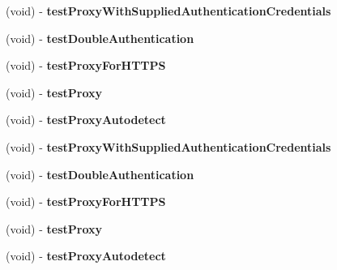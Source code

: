 \begin{DoxyCompactItemize}
\item 
\hypertarget{interface_proxy_tests_a51146a296d58652cdf040a0e36c39d96}{
(void) -\/ {\bfseries test\-Proxy\-With\-Supplied\-Authentication\-Credentials}}
\label{interface_proxy_tests_a51146a296d58652cdf040a0e36c39d96}

\item 
\hypertarget{interface_proxy_tests_a37018a3f1cce212ab02d59150bf021fc}{
(void) -\/ {\bfseries test\-Double\-Authentication}}
\label{interface_proxy_tests_a37018a3f1cce212ab02d59150bf021fc}

\item 
\hypertarget{interface_proxy_tests_aa344ec9954815b1d25a1d9d60ce5136c}{
(void) -\/ {\bfseries test\-Proxy\-For\-H\-T\-T\-P\-S}}
\label{interface_proxy_tests_aa344ec9954815b1d25a1d9d60ce5136c}

\item 
\hypertarget{interface_proxy_tests_a40fc96bd3915e51e2e1d9121df01b37e}{
(void) -\/ {\bfseries test\-Proxy}}
\label{interface_proxy_tests_a40fc96bd3915e51e2e1d9121df01b37e}

\item 
\hypertarget{interface_proxy_tests_a52703f731ab16ea703ab0b9983b559d2}{
(void) -\/ {\bfseries test\-Proxy\-Autodetect}}
\label{interface_proxy_tests_a52703f731ab16ea703ab0b9983b559d2}

\item 
\hypertarget{interface_proxy_tests_a51146a296d58652cdf040a0e36c39d96}{
(void) -\/ {\bfseries test\-Proxy\-With\-Supplied\-Authentication\-Credentials}}
\label{interface_proxy_tests_a51146a296d58652cdf040a0e36c39d96}

\item 
\hypertarget{interface_proxy_tests_a37018a3f1cce212ab02d59150bf021fc}{
(void) -\/ {\bfseries test\-Double\-Authentication}}
\label{interface_proxy_tests_a37018a3f1cce212ab02d59150bf021fc}

\item 
\hypertarget{interface_proxy_tests_aa344ec9954815b1d25a1d9d60ce5136c}{
(void) -\/ {\bfseries test\-Proxy\-For\-H\-T\-T\-P\-S}}
\label{interface_proxy_tests_aa344ec9954815b1d25a1d9d60ce5136c}

\item 
\hypertarget{interface_proxy_tests_a40fc96bd3915e51e2e1d9121df01b37e}{
(void) -\/ {\bfseries test\-Proxy}}
\label{interface_proxy_tests_a40fc96bd3915e51e2e1d9121df01b37e}

\item 
\hypertarget{interface_proxy_tests_a52703f731ab16ea703ab0b9983b559d2}{
(void) -\/ {\bfseries test\-Proxy\-Autodetect}}
\label{interface_proxy_tests_a52703f731ab16ea703ab0b9983b559d2}


\end{DoxyCompactItemize}
